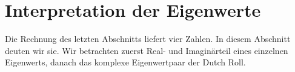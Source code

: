 %
%
%
%
%

\section{Interpretation der Eigenwerte
\label{aircraft:section:5-interpretation}}
Die Rechnung des letzten Abschnitts liefert vier Zahlen.
In diesem Abschnitt deuten wir sie.
Wir betrachten zuerst Real- und Imaginärteil eines einzelnen
Eigenwerts, danach das komplexe Eigenwertpaar der Dutch Roll.


